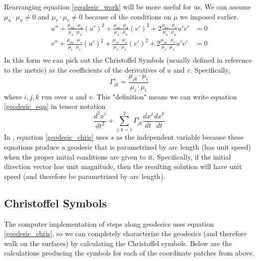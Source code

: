 \documentclass{article}
\begin{document}
		Rearranging equation \ref{geodesic_work} will be more useful for us. We can assume $\mu_u \cdot \mu_u \neq 0$  and $\mu_v \cdot \mu_v \neq 0$ because of the conditions on $\mu$ we imposed earlier.
		\begin{equation} \label{geodesic_eqn} \begin{split}
			u'' + \frac{\mu_{uu} \cdot \mu_u}{\mu_u \cdot \mu_u} (u')^2 + \frac{\mu_{vv} \cdot \mu_u}{\mu_u \cdot \mu_u} (v')^2 + 2\frac{\mu_{uv} \cdot \mu_u}{\mu_u \cdot \mu_u} u'v' & = 0 \\
			v'' + \frac{\mu_{uu} \cdot \mu_v}{\mu_v \cdot \mu_v} (u')^2 + \frac{\mu_{vv} \cdot \mu_v}{\mu_v \cdot \mu_v} (v')^2 + 2\frac{\mu_{uv} \cdot \mu_v}{\mu_v \cdot \mu_v} u'v' & = 0 \\
		\end{split} \end{equation}
		In this form we can pick out the Christoffel Symbols (usually defined in reference to the metric) as the coefficients of the derivatives of $u$ and $v$. Specifically,
		\begin{equation}
			\Gamma^i_{jk} = \frac{\mu_{jk} \cdot \mu_i}{\mu_i \cdot \mu_i}
		\end{equation}
		where $i,j,k$ run over $u$ and $v$.
		This "definition" means we can write equation \ref{geodesic_eqn} in tensor notation
		\begin{equation} \label{geodesic_chris}
			\frac{d^2 x^i}{dt^2} + \sum_{j,k = 1}^2 \Gamma^i_{jk} \frac{d x^j}{dt} \frac{dx^k}{dt}
		\end{equation}
		In \cite{BanchoffLovett_DiffGeo_2010}, equation \ref{geodesic_chris} uses $s$ as the independent variable because these equations produce a geodesic that is parametrized by arc length (has unit speed) when the proper initial conditions are given to it.
		Specifically, if the initial direction vector has unit magnitude, then the resulting solution will have unit speed (and therefore be parametrized by arc length).
		
	
	\subsection{Christoffel Symbols}
		The computer implementation of steps along geodesics uses equation \ref{geodesic_chris}, so we can completely characterize the geodesics (and therefore walk on the surfaces) by calculating the Christoffel symbols.
		Below are the calculations producing the symbols for each of the coordinate patches from above.
		
\end{document}
